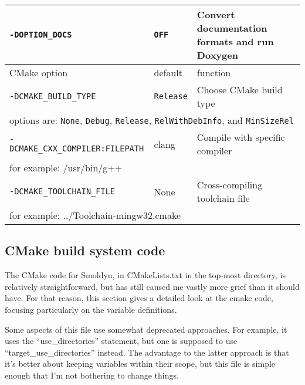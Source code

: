 \documentclass {scrbook}
\newcommand {\ttt} {\texttt}
\begin{document}
\begin{longtable}[c]{lll}
\ttt{-DOPTION\_DOCS} & \ttt{OFF} & Convert documentation formats and run Doxygen\\
\hline
CMake option & default & function\\
\hline
\ttt{-DCMAKE\_BUILD\_TYPE} & \ttt{Release} & Choose CMake build type\\
\multicolumn{3}{l}{\hspace{0.3in}options are: \ttt{None}, \ttt{Debug}, \ttt{Release}, \ttt{RelWithDebInfo}, and \ttt{MinSizeRel}}\\
\ttt{-DCMAKE\_CXX\_COMPILER:FILEPATH} & clang & Compile with specific compiler\\
\multicolumn{3}{l}{\hspace{0.3in}for example: /usr/bin/g++}\\
\ttt{-DCMAKE\_TOOLCHAIN\_FILE} & None & Cross-compiling toolchain file \\
\multicolumn{3}{l}{\hspace{0.3in}for example: ../Toolchain-mingw32.cmake}\\
\end{longtable}


\subsection{CMake build system code}

The CMake code for Smoldyn, in CMakeLists.txt in the top-most directory, is relatively straightforward, but has still caused me vastly more grief than it should have. For that reason, this section gives a detailed look at the cmake code, focusing particularly on the variable definitions.

Some aspects of this file use somewhat deprecated approaches. For example, it uses the ``use\_directories'' statement, but one is supposed to use ``target\_use\_directories'' instead. The advantage to the latter approach is that it's better about keeping variables within their scope, but this file is simple enough that I'm not bothering to change things.
\end{document}
